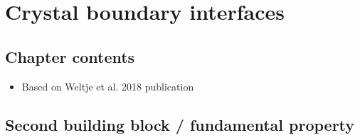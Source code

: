 \chapter{Crystal boundary interfaces}\label{ch:interfaces}

\section{Chapter contents}
\begin{itemize}
    \item Based on Weltje et al. 2018 publication
\end{itemize}

\section{Second building block / fundamental property}
\section{}




\cleardoublepage

